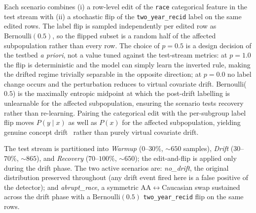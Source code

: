 \documentclass[sigconf,anonymous,review]{acmart}
\begin{document}
Each scenario combines (i) a row-level edit of the \texttt{race} categorical feature in the test stream with (ii) a stochastic flip of the
\texttt{two\_year\_recid} label on the same edited rows. The label flip is sampled independently per edited row as $\mathrm{Bernoulli}(0.5)$, so the
flipped subset is a random half of the affected subpopulation rather than every row. The choice of $p=0.5$ is a design decision of the testbed
\emph{a priori}, not a value tuned against the test-stream metrics: at $p=1.0$ the flip is deterministic and the model can simply learn the inverted
rule, making the drifted regime trivially separable in the opposite direction; at $p=0.0$ no label change occurs and the perturbation reduces to virtual
covariate drift. Bernoulli($0.5$) is the maximally entropic midpoint at which the post-drift labelling is unlearnable for the affected subpopulation,
ensuring the scenario tests recovery rather than re-learning. Pairing the categorical edit with the per-subgroup label flip moves $P(y \mid x)$ as well
as $P(x)$ for the affected subpopulation, yielding genuine concept drift~\cite{DBLP:journals/corr/WebbHCNP15} rather than purely virtual covariate drift.

The test stream is partitioned into \emph{Warmup} ($0$--$30\%$, $\sim 650$ samples), \emph{Drift} ($30$--$70\%$, $\sim 865$), and \emph{Recovery}
($70$--$100\%$, $\sim 650$); the edit-and-flip is applied only during the drift phase. The two active scenarios are: \emph{no\_drift}, the original
distribution preserved throughout (any drift event fired here is a false positive of the detector); and \emph{abrupt\_race}, a symmetric AA$\leftrightarrow$Caucasian swap sustained
across the drift phase with a $\mathrm{Bernoulli}(0.5)$ \texttt{two\_year\_recid} flip on the same rows.
\end{document}
